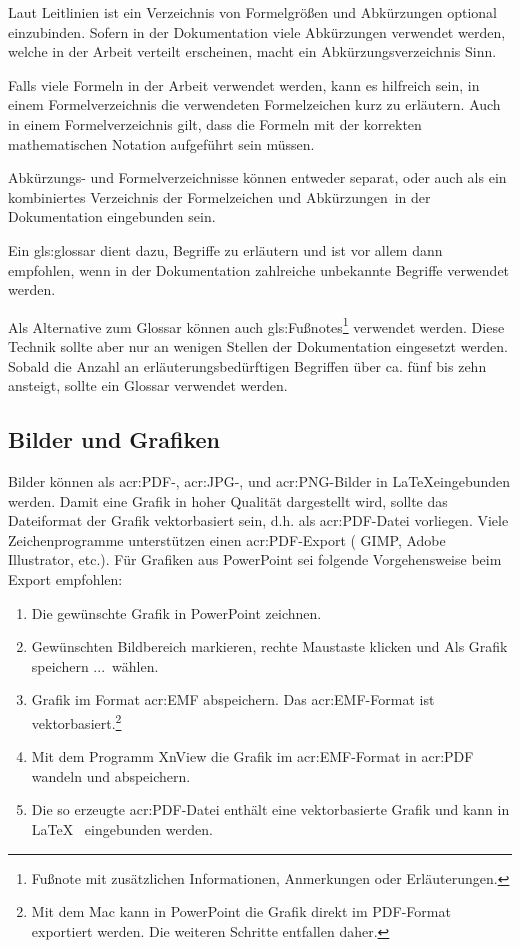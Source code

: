 Laut Leitlinien ist ein Verzeichnis von Formelgrößen und Abkürzungen optional einzubinden. Sofern in der Dokumentation viele Abkürzungen verwendet werden, welche in der Arbeit verteilt erscheinen, macht ein Abkürzungsverzeichnis Sinn.

Falls viele Formeln in der Arbeit verwendet werden, kann es hilfreich sein, in einem Formelverzeichnis die verwendeten Formelzeichen kurz zu erläutern. Auch in einem Formelverzeichnis gilt, dass die Formeln mit der korrekten mathematischen Notation aufgeführt sein müssen.

Abkürzungs- und Formelverzeichnisse können entweder separat, oder auch als ein kombiniertes \glqq Verzeichnis der Formelzeichen und Abkürzungen\grqq~in der Dokumentation eingebunden sein.

Ein \gls{gls:glossar} dient dazu, Begriffe zu erläutern und ist vor allem dann empfohlen, wenn in der Dokumentation zahlreiche unbekannte Begriffe verwendet werden. 

Als Alternative zum Glossar können auch \glspl{gls:Fußnote}\footnote{Fußnote mit zusätzlichen Informationen, Anmerkungen oder Erläuterungen.} verwendet werden. Diese Technik sollte aber nur an wenigen Stellen der Dokumentation eingesetzt werden. Sobald die Anzahl an erläuterungsbedürftigen Begriffen über ca. fünf bis zehn ansteigt, sollte ein Glossar verwendet werden.

\subsection{Bilder und Grafiken}

Bilder können als \acrshort{acr:PDF}-, \acrshort{acr:JPG}-, und \acrshort{acr:PNG}-Bilder in \LaTeX eingebunden werden. Damit eine Grafik in hoher Qualität dargestellt wird, sollte das Dateiformat der Grafik vektorbasiert sein, d.h. als \acrshort{acr:PDF}-Datei vorliegen. Viele Zeichenprogramme unterstützen einen \acrshort{acr:PDF}-Export ( GIMP, Adobe Illustrator, etc.). Für Grafiken aus PowerPoint sei folgende Vorgehensweise beim Export empfohlen:

\begin{enumerate}
	\item Die gewünschte Grafik in PowerPoint zeichnen.
	\item Gewünschten Bildbereich markieren, rechte Maustaste klicken und \glqq Als Grafik speichern ...\grqq~wählen.
	\item Grafik im Format \acrshort{acr:EMF} abspeichern. Das \acrshort{acr:EMF}-Format ist vektorbasiert.\footnote{Mit dem Mac kann in PowerPoint die Grafik direkt im PDF-Format exportiert werden. Die weiteren Schritte entfallen daher.}
	\item Mit dem Programm XnView die Grafik im \acrshort{acr:EMF}-Format in \acrshort{acr:PDF} wandeln und abspeichern.
	\item Die so erzeugte \acrshort{acr:PDF}-Datei enthält eine vektorbasierte Grafik und kann in \LaTeX~ eingebunden werden.
\end{enumerate}

